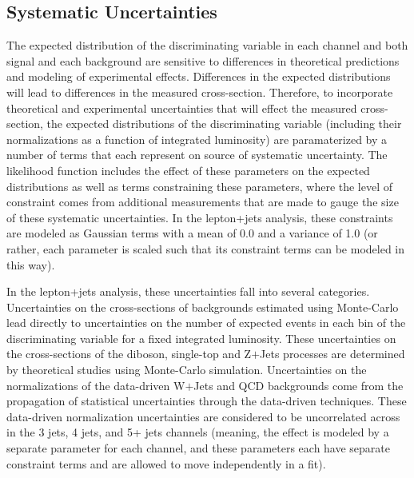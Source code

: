 \subsection{Systematic Uncertainties}

The expected distribution of the discriminating variable in each channel and both signal and each background are sensitive to differences in theoretical predictions and modeling of experimental effects.
Differences in the expected distributions will lead to differences in the measured cross-section.
Therefore, to incorporate theoretical and experimental uncertainties that will effect the measured cross-section, the expected distributions of the discriminating variable (including their normalizations as a function of integrated luminosity) are paramaterized by a number of terms that each represent on source of systematic uncertainty.
The likelihood function includes the effect of these parameters on the expected distributions as well as terms constraining these parameters, where the level of constraint comes from additional measurements that are made to gauge the size of these systematic uncertainties.
In the lepton+jets analysis, these constraints are modeled as Gaussian terms with a mean of 0.0 and a variance of 1.0 (or rather, each parameter is scaled such that its constraint terms can be modeled in this way).

In the lepton+jets analysis, these uncertainties fall into several categories.  
Uncertainties on the cross-sections of backgrounds estimated using Monte-Carlo lead directly to uncertainties on the number of expected events in each bin of the discriminating variable for a fixed integrated luminosity.
These uncertainties on the cross-sections of the diboson, single-top and Z$+$Jets processes are determined by theoretical studies using Monte-Carlo simulation.
Uncertainties on the normalizations of the data-driven W$+$Jets and QCD backgrounds come from the propagation of statistical uncertainties through the data-driven techniques.
These data-driven normalization uncertainties are considered to be uncorrelated across in the 3 jets, 4 jets, and 5+ jets channels (meaning, the effect is modeled by a separate parameter for each channel, and these parameters each have separate constraint terms and are allowed to move independently in a fit).

